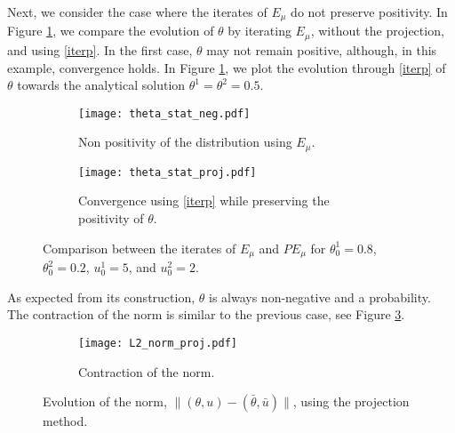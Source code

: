 \documentclass[12pt]{amsart}
\newcommand{\1}{{\chi}}
\theoremstyle{definition}
\begin{document}
        Next, we consider the case where the iterates of $E_\mu$ do not preserve positivity.  
        In Figure \ref{fig:Positivity_comp}, we compare the evolution of $\theta$ by iterating  $E_\mu$, without the projection, and using \eqref{iterp}.
        In the first case,  $\theta$ may not remain positive, although, in this example, convergence holds. In Figure \ref{fig:Positivity_comp},
        we plot the evolution through  \eqref{iterp} of $\theta$ towards the analytical solution $\theta^1=\theta^2=0.5$.
        \begin{figure}
                \centering
                \begin{subfigure}{0.5\textwidth}
                        \centering
                        \texttt{[image: theta\_stat\_neg.pdf]}
                        \caption{Non positivity of the distribution using $E_\mu$.}
                \end{subfigure}
                \begin{subfigure}{0.5\textwidth}
                        \centering
                        \texttt{[image: theta\_stat\_proj.pdf]}
                        \caption{Convergence using \eqref{iterp} while preserving the positivity of $\theta$.}
                \end{subfigure}
                \caption{Comparison between the iterates of $E_\mu$ and $PE_\mu$ for $\theta^1_0=0.8$, $\theta^2_0=0.2$, 
                        $u^1_0=5$, and $u^2_0=2$.}
                \label{fig:Positivity_comp}
        \end{figure}
        As expected from its construction, $\theta$ is always non-negative and a  probability. The contraction of the norm is similar to the 
        previous case, see Figure \ref{fig:k_L2_norm_proj}.
        \begin{figure}
                \centering
                \begin{subfigure}{0.5\textwidth}
                        \centering
                        \texttt{[image: L2\_norm\_proj.pdf]}
                        \caption{Contraction of the norm.}
                        \label{fig:k_L2_norm_proj}
                \end{subfigure}
                \caption{Evolution of the norm, $\|(\theta,u)-(\bar \theta,\bar u)\|$, using the projection method.}
                \label{fig:k_L2_norm_proj}
        \end{figure}
\end{document}
